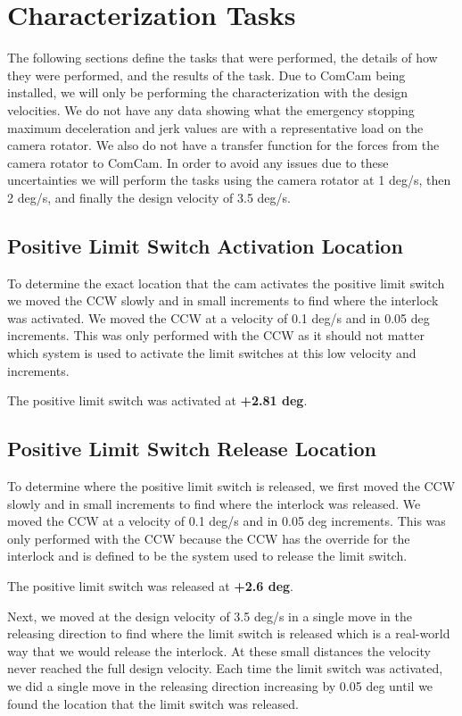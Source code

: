 \documentclass[SE,lsstdraft,authoryear,toc]{lsstdoc}
\begin{document}
\section{Characterization Tasks}\label{sec:Characterization Tasks}

The following sections define the tasks that were performed, the details of how they were performed, and the results of the task. Due to ComCam being installed, we will only be performing the characterization with the design velocities. We do not have any data showing what the emergency stopping maximum deceleration and jerk values are with a representative load on the camera rotator. We also do not have a transfer function for the forces from the camera rotator to ComCam. In order to avoid any issues due to these uncertainties we will perform the tasks using the camera rotator at 1 deg/s, then 2 deg/s, and finally the design velocity of 3.5 deg/s.

\subsection{Positive Limit Switch Activation Location}

To determine the exact location that the cam activates the positive
limit switch we moved the CCW slowly and in small increments to find
where the interlock was activated. We moved the CCW at a velocity of 0.1
deg/s and in 0.05 deg increments. This was only performed with the CCW
as it should not matter which system is used to activate the limit
switches at this low velocity and increments.

The positive limit switch was activated at \textbf{+2.81 deg}.

\subsection{Positive Limit Switch Release Location}

To determine where the positive limit switch is released, we first moved
the CCW slowly and in small increments to find where the interlock was
released. We moved the CCW at a velocity of 0.1 deg/s and in 0.05 deg
increments. This was only performed with the CCW because the CCW has the
override for the interlock and is defined to be the system used to
release the limit switch.

The positive limit switch was released at \textbf{+2.6 deg}.

Next, we moved at the design velocity of 3.5 deg/s in a single move in
the releasing direction to find where the limit switch is released which
is a real-world way that we would release the interlock. At these small
distances the velocity never reached the full design velocity. Each time
the limit switch was activated, we did a single move in the releasing
direction increasing by 0.05 deg until we found the location that the
limit switch was released.
\end{document}

